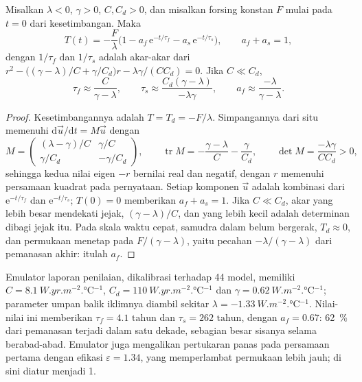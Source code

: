 \begin{theorem}\label{thm:b3:climate-models:two-layer}
Misalkan $\lambda < 0$, $\gamma > 0$, $C, C_d > 0$, dan misalkan forsing konstan
$F$ mulai pada $t = 0$ dari kesetimbangan. Maka
\[
T(t) = -\frac{F}{\lambda}\Big(1 - a_f\,\mathrm e^{-t/\tau_f} - a_s\,\mathrm
e^{-t/\tau_s}\Big), \qquad a_f + a_s = 1 ,
\]
dengan $1/\tau_f$ dan $1/\tau_s$ adalah akar-akar dari $r^2 - \big((\gamma -
\lambda)/C + \gamma/C_d\big)r - \lambda\gamma/(CC_d) = 0$. Jika $C \ll C_d$,
\[
\tau_f \approx \frac{C}{\gamma - \lambda}, \qquad
\tau_s \approx \frac{C_d(\gamma - \lambda)}{-\lambda\gamma}, \qquad
a_f \approx \frac{-\lambda}{\gamma - \lambda} .
\]
\end{theorem}

\begin{proof}
Kesetimbangannya adalah $T = T_d = -F/\lambda$. Simpangannya dari situ memenuhi
$\mathrm d\vec u/\mathrm dt = M\vec u$ dengan
\[
M = \begin{pmatrix} (\lambda - \gamma)/C & \gamma/C\\ \gamma/C_d &
-\gamma/C_d\end{pmatrix}, \qquad
\operatorname{tr}M = -\frac{\gamma - \lambda}{C} - \frac{\gamma}{C_d},
\qquad \det M = \frac{-\lambda\gamma}{CC_d} > 0 ,
\]
sehingga kedua nilai eigen $-r$ bernilai real dan negatif, dengan $r$ memenuhi persamaan kuadrat
pada pernyataan. Setiap komponen $\vec u$ adalah kombinasi dari $\mathrm
e^{-t/\tau_f}$ dan $\mathrm e^{-t/\tau_s}$; $T(0) = 0$ memberikan $a_f + a_s =
1$. Jika $C \ll C_d$, akar yang lebih besar mendekati jejak, $(\gamma -
\lambda)/C$, dan yang lebih kecil adalah determinan dibagi jejak itu. Pada skala
waktu cepat, samudra dalam belum bergerak, $T_d \approx 0$, dan permukaan
menetap pada $F/(\gamma - \lambda)$, yaitu pecahan $-\lambda/(\gamma - \lambda)$
dari pemanasan akhir: itulah $a_f$.
\end{proof}

Emulator laporan penilaian, dikalibrasi terhadap 44 model, memiliki $C =
\qty{8.1}{W.yr.m^{-2}.\celsius^{-1}}$, $C_d = \qty{110}{W.yr.m^{-2}.\celsius^{-1}}$
dan $\gamma = \qty{0.62}{W.m^{-2}.\celsius^{-1}}$; parameter umpan balik iklimnya
diambil sekitar $\lambda = \qty{-1.33}{W.m^{-2}.\celsius^{-1}}$. Nilai-nilai ini
memberikan $\tau_f = \num{4.1}\text{ tahun}$ dan $\tau_s = \num{262}\text{ tahun}$, dengan $a_f =
0.67$: \qty{62}{\percent} dari pemanasan terjadi dalam satu dekade, sebagian besar
sisanya selama berabad-abad. Emulator juga mengalikan pertukaran panas pada
persamaan pertama dengan efikasi $\varepsilon = 1.34$, yang memperlambat permukaan
lebih jauh; di sini diatur menjadi 1.

